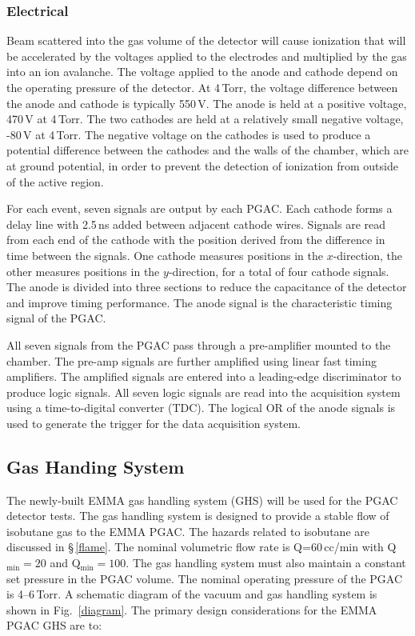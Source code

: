 \subsubsection{Electrical}
Beam scattered into the gas volume of the detector will cause ionization that will be accelerated by the %
 voltages applied to the electrodes and multiplied by the gas into an ion avalanche.
The  voltage applied to the anode and cathode depend on the operating pressure of the detector.  At 4\,Torr, the voltage difference between the anode and cathode is typically 550\,V.  The anode is held at a positive voltage, 470\,V at 4\,Torr.  The two cathodes are held at a relatively small negative voltage, -80\,V at 4\,Torr.  The negative voltage on the cathodes is used to produce a potential difference between the cathodes and the walls of the chamber, which are at ground potential, in order to prevent the detection of ionization from outside of the active region.  

For each event, seven signals are output by each PGAC. Each cathode forms a delay line with 2.5\,ns added between adjacent cathode wires.  Signals are read from each end of the cathode with the position derived from the difference in time between the signals.  One cathode measures positions in the $x$-direction, the other measures positions in the $y$-direction, for a total of four cathode signals.
The anode is divided into three sections to reduce the capacitance of the detector and improve timing performance.  The anode signal is the characteristic timing signal of the PGAC.%

All seven signals from the PGAC pass through a  %
pre-amplifier mounted to the chamber.  The pre-amp signals are further amplified using linear fast timing amplifiers.  The amplified signals are entered into a leading-edge discriminator to produce logic signals.  All seven logic signals are read into the acquisition system using a time-to-digital converter (TDC).  %
The logical OR of the anode signals is used to generate the trigger for the data acquisition system.%


\subsection{Gas Handing System}
The newly-built EMMA gas handling system (GHS) will be used for the PGAC detector tests.
The gas handling system is designed to provide a stable flow of isobutane gas to the EMMA PGAC.  The hazards related to isobutane are discussed in \S\,\ref{flame}. The nominal volumetric flow rate is Q=60\,cc/min with Q$_\textrm{min}=20$ and Q$_\textrm{min}=100$.
The gas handling system must also maintain a constant set pressure  in the PGAC volume. The nominal operating pressure of the PGAC is 4--6\,Torr.
A schematic diagram of the vacuum and gas handling system  is shown in Fig.~\ref{diagram}. 
The primary design considerations for the EMMA PGAC GHS are to:

